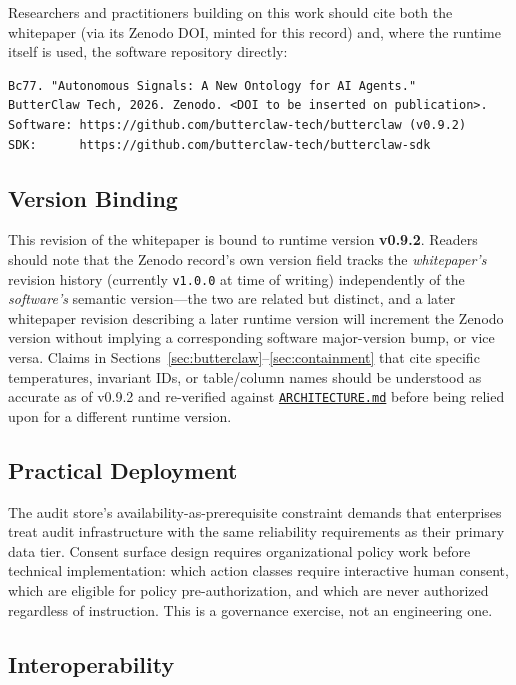 \documentclass[11pt,a4paper]{article}
\begin{document}
Researchers and practitioners building on this work should cite both the whitepaper (via its
Zenodo DOI, minted for this record) and, where the runtime itself is used, the software
repository directly:

\begin{lstlisting}[caption={Suggested citation form}]
Bc77. "Autonomous Signals: A New Ontology for AI Agents."
ButterClaw Tech, 2026. Zenodo. <DOI to be inserted on publication>.
Software: https://github.com/butterclaw-tech/butterclaw (v0.9.2)
SDK:      https://github.com/butterclaw-tech/butterclaw-sdk
\end{lstlisting}

\subsection{Version Binding}

This revision of the whitepaper is bound to runtime version \textbf{v0.9.2}. Readers should note
that the Zenodo record's own version field tracks the \emph{whitepaper's} revision history
(currently \texttt{v1.0.0} at time of writing) independently of the \emph{software's} semantic
version---the two are related but distinct, and a later whitepaper revision describing a later
runtime version will increment the Zenodo version without implying a corresponding software
major-version bump, or vice versa. Claims in Sections~\ref{sec:butterclaw}--\ref{sec:containment}
that cite specific temperatures, invariant IDs, or table/column names should be understood as
accurate as of v0.9.2 and re-verified against \href{https://github.com/butterclaw-tech/butterclaw/blob/main/docs/ARCHITECTURE.md}{\texttt{ARCHITECTURE.md}} before being relied upon
for a different runtime version.

\subsection{Practical Deployment}

The audit store's availability-as-prerequisite constraint demands that enterprises treat audit
infrastructure with the same reliability requirements as their primary data tier. Consent surface
design requires organizational policy work before technical implementation: which action classes
require interactive human consent, which are eligible for policy pre-authorization, and which
are never authorized regardless of instruction. This is a governance exercise, not an engineering
one.

\subsection{Interoperability}
\end{document}
